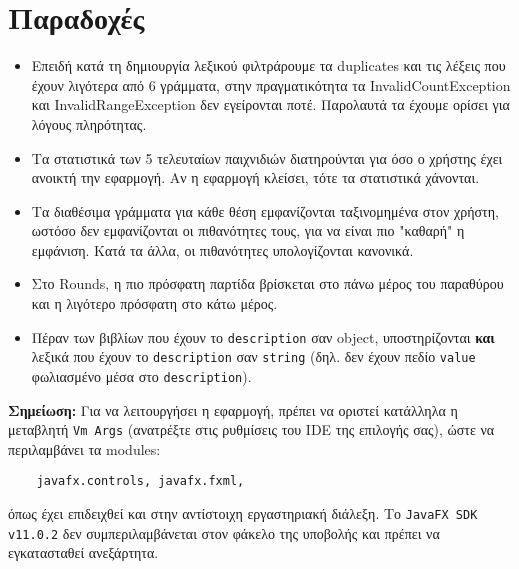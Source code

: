 \documentclass[a4paper, 12pt]{article}
\begin{document}
\section{Παραδοχές}	

\begin{itemize}

	\item Επειδή κατά τη δημιουργία λεξικού φιλτράρουμε τα duplicates και τις λέξεις που έχουν λιγότερα από 6 γράμματα, στην πραγματικότητα τα InvalidCountException και InvalidRangeException δεν εγείρονται ποτέ. Παρολαυτά τα έχουμε ορίσει για λόγους πληρότητας.

	\item Τα στατιστικά των 5 τελευταίων παιχνιδιών διατηρούνται για όσο ο χρήστης έχει ανοικτή την εφαρμογή. Αν η εφαρμογή κλείσει, τότε τα στατιστικά χάνονται.

	\item Τα διαθέσιμα γράμματα για κάθε θέση εμφανίζονται ταξινομημένα στον χρήστη, ωστόσο δεν εμφανίζονται οι πιθανότητες τους, για να είναι πιο "καθαρή" η εμφάνιση. Κατά τα άλλα, οι πιθανότητες υπολογίζονται κανονικά.

	\item Στο Rounds, η πιο πρόσφατη παρτίδα βρίσκεται στο πάνω μέρος του παραθύρου και η λιγότερο πρόσφατη στο κάτω μέρος.

	\item Πέραν των βιβλίων που έχουν το \verb|description| σαν object, υποστηρίζονται \textbf{και} λεξικά που έχουν το \verb|description| σαν \verb|string| (δηλ. δεν έχουν πεδίο \verb|value| φωλιασμένο μέσα στο \verb|description|).

\end{itemize}

\textbf{Σημείωση:} Για να λειτουργήσει η εφαρμογή, πρέπει να οριστεί κατάλληλα η μεταβλητή \verb|Vm Args| (ανατρέξτε στις ρυθμίσεις του IDE της επιλογής σας), ώστε να περιλαμβάνει τα modules: 
\begin{verbatim}
	javafx.controls, javafx.fxml,
\end{verbatim}
όπως έχει επιδειχθεί και στην αντίστοιχη εργαστηριακή διάλεξη. Το \verb|JavaFX SDK v11.0.2| δεν συμπεριλαμβάνεται στον φάκελο της υποβολής και πρέπει να εγκατασταθεί ανεξάρτητα.
\end{document}
